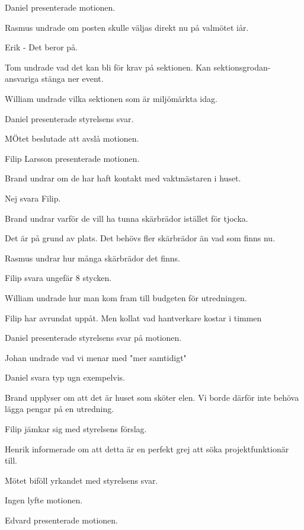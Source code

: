 \documentclass[10pt]{article}
\begin{document}
\begin{paragrafer}
\begin{paragrafer}
		Daniel presenterade motionen. 

		Rasmus undrade om posten skulle väljas direkt nu på valmötet iår.

		Erik - Det beror på.

		Tom undrade vad det kan bli för krav på sektionen. Kan sektionsgrodan-ansvariga stänga ner event. 

		William undrade vilka sektionen som är miljömärkta idag.

		Daniel presenterade styrelsens svar. 

		MÖtet beslutade att avslå motionen.


		Filip Larsson presenterade motionen. 

		Brand undrar om de har haft kontakt med vaktmästaren i huset.

		Nej svara Filip. 

		Brand undrar varför de vill ha tunna skärbrädor istället för tjocka.

		Det är på grund av plats. Det behövs fler skärbrädor än vad som finns nu.

		Rasmus undrar hur många skärbrädor det finns.

		Filip svara ungefär 8 stycken.

		William undrade hur man kom fram till budgeten för utredningen.

		Filip har avrundat uppåt. Men kollat vad hantverkare kostar i timmen
		
		Daniel presenterade styrelsens svar på motionen. 

		Johan undrade vad vi menar med "mer samtidigt"

		Daniel svara typ ugn exempelvis.

		Brand upplyser om att det är huset som sköter elen. Vi borde därför inte behöva lägga pengar på en utredning. 

		Filip jämkar sig med styrelsens förslag.

		Henrik informerade om att detta är en perfekt grej att söka projektfunktionär till.

		Mötet biföll yrkandet med styrelsens svar. 


		Ingen lyfte motionen.		



		Edvard presenterade motionen.


\end{paragrafer}
\end{paragrafer}
\end{document}
